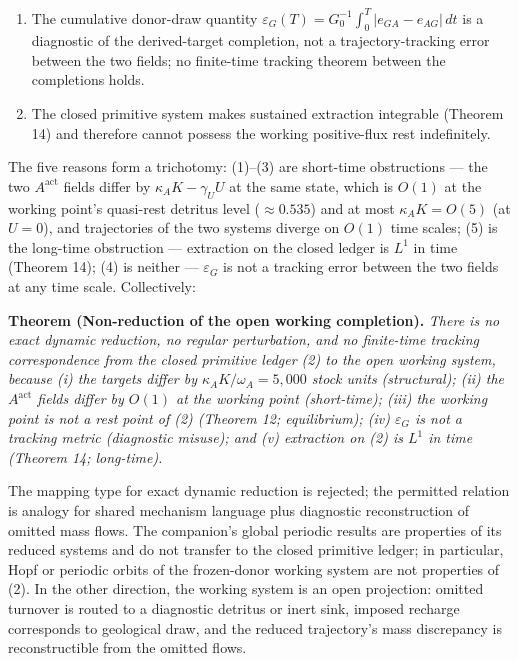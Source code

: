 \documentclass[11pt]{article}
\begin{document}
\begin{enumerate}
  primitive donor flow is
  \(e_{GA} - e_{AG} = \omega_A(A^{\mathrm{eq,intrinsic}} - A^{\mathrm{act,*}}) \approx -0.348\):
  the donor gains in the closed ledger where the working completion has
  it losing \(4.652\) --- the two fields have opposite signs on the
  donor coordinate, not merely different magnitudes. The working-point
  figures \(E^* \approx 2.090\), \(N^* = 89.526\),
  \(A^{\mathrm{act,*}} = 397.87\), and the recharge \(4.652\) are
  imported at the companion's registered precision; the reverse check
  \(qE^*N^* = 0.001 \times 2.090 \times 89.526 \approx 0.187\) is
  consistent to the quoted digits.
\item
  The cumulative donor-draw quantity
  \(\varepsilon_G(T) = G_0^{-1}\int_0^T |e_{GA} - e_{AG}|\, dt\) is a
  diagnostic of the derived-target completion, not a trajectory-tracking
  error between the two fields; no finite-time tracking theorem between
  the completions holds.
\item
  The closed primitive system makes sustained extraction integrable
  (Theorem 14) and therefore cannot possess the working positive-flux
  rest indefinitely.
\end{enumerate}

The five reasons form a trichotomy: (1)--(3) are short-time obstructions
--- the two \(A^{\mathrm{act}}\) fields differ by
\(\kappa_A K - \gamma_U U\) at the same state, which is \(O(1)\) at the
working point's quasi-rest detritus level (\(\approx 0.535\)) and at
most \(\kappa_A K = O(5)\) (at \(U = 0\)), and trajectories of the two
systems diverge on \(O(1)\) time scales; (5) is the long-time
obstruction --- extraction on the closed ledger is \(L^1\) in time
(Theorem 14); (4) is neither --- \(\varepsilon_G\) is not a tracking
error between the two fields at any time scale. Collectively:

\textbf{Theorem (Non-reduction of the open working completion).}
\emph{There is no exact dynamic reduction, no regular perturbation, and
no finite-time tracking correspondence from the closed primitive ledger
(2) to the open working system, because (i) the targets differ by
\(\kappa_A K/\omega_A = 5{,}000\) stock units (structural); (ii) the
\(A^{\mathrm{act}}\) fields differ by \(O(1)\) at the working point
(short-time); (iii) the working point is not a rest point of (2)
(Theorem 12; equilibrium); (iv) \(\varepsilon_G\) is not a tracking
metric (diagnostic misuse); and (v) extraction on (2) is \(L^1\) in time
(Theorem 14; long-time).}

The mapping type for exact dynamic reduction is rejected; the permitted
relation is analogy for shared mechanism language plus diagnostic
reconstruction of omitted mass flows. The companion's global periodic
results are properties of its reduced systems and do not transfer to the
closed primitive ledger; in particular, Hopf or periodic orbits of the
frozen-donor working system are not properties of (2). In the other
direction, the working system is an open projection: omitted turnover is
routed to a diagnostic detritus or inert sink, imposed recharge
corresponds to geological draw, and the reduced trajectory's mass
discrepancy is reconstructible from the omitted flows.
\end{document}
